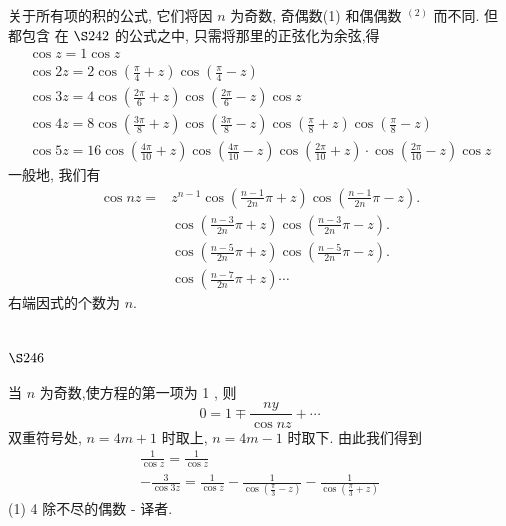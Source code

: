 关于所有项的积的公式, 它们将因 $n$ 为奇数, 奇偶数(1) 和偶偶数 ${ }^{(2)}$ 而不同. 但都包含 在 $\S 242$ 的公式之中, 只需将那里的正弦化为余弦,得
\[
\begin{gathered}
\cos z=1 \cos z \\
\cos 2 z=2 \cos \left(\frac{\pi}{4}+z\right) \cos \left(\frac{\pi}{4}-z\right) \\
\cos 3 z=4 \cos \left(\frac{2 \pi}{6}+z\right) \cos \left(\frac{2 \pi}{6}-z\right) \cos z \\
\cos 4 z=8 \cos \left(\frac{3 \pi}{8}+z\right) \cos \left(\frac{3 \pi}{8}-z\right) \cos \left(\frac{\pi}{8}+z\right) \cos \left(\frac{\pi}{8}-z\right) \\
\cos 5 z=16 \cos \left(\frac{4 \pi}{10}+z\right) \cos \left(\frac{4 \pi}{10}-z\right) \cos \left(\frac{2 \pi}{10}+z\right) \cdot \cos \left(\frac{2 \pi}{10}-z\right) \cos z
\end{gathered}
\]
一般地, 我们有
\[
\begin{aligned}
\cos n z= & z^{n-1} \cos \left(\frac{n-1}{2 n} \pi+z\right) \cos \left(\frac{n-1}{2 n} \pi-z\right) . \\
& \cos \left(\frac{n-3}{2 n} \pi+z\right) \cos \left(\frac{n-3}{2 n} \pi-z\right) . \\
& \cos \left(\frac{n-5}{2 n} \pi+z\right) \cos \left(\frac{n-5}{2 n} \pi-z\right) . \\
& \cos \left(\frac{n-7}{2 n} \pi+z\right) \cdots
\end{aligned}
\]
右端因式的个数为 $n$.

\section{$\S 246$}

当 $n$ 为奇数,使方程的第一项为 1 , 则
\[
0=1 \mp \frac{n y}{\cos n z}+\cdots
\]
双重符号处, $n=4 m+1$ 时取上, $n=4 m-1$ 时取下. 由此我们得到
\[
\begin{gathered}
\frac{1}{\cos z}=\frac{1}{\cos z} \\
-\frac{3}{\cos 3 z}=\frac{1}{\cos z}-\frac{1}{\cos \left(\frac{\pi}{3}-z\right)}-\frac{1}{\cos \left(\frac{\pi}{3}+z\right)}
\end{gathered}
\]
(1) 4 除不尽的偶数 - 译者.

